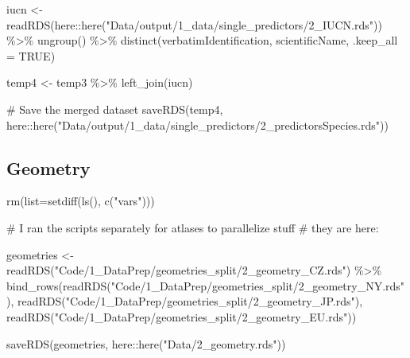 \documentclass[
  letterpaper,
  DIV=11,
  numbers=noendperiod]{scrreprt}
\newenvironment{Shaded}{\begin{snugshade}}{\end{snugshade}}
\newcommand{\AttributeTok}[1]{\textcolor[rgb]{0.40,0.45,0.13}{#1}}
\newcommand{\CommentTok}[1]{\textcolor[rgb]{0.37,0.37,0.37}{#1}}
\newcommand{\ConstantTok}[1]{\textcolor[rgb]{0.56,0.35,0.01}{#1}}
\newcommand{\FunctionTok}[1]{\textcolor[rgb]{0.28,0.35,0.67}{#1}}
\newcommand{\NormalTok}[1]{\textcolor[rgb]{0.00,0.23,0.31}{#1}}
\newcommand{\OtherTok}[1]{\textcolor[rgb]{0.00,0.23,0.31}{#1}}
\newcommand{\SpecialCharTok}[1]{\textcolor[rgb]{0.37,0.37,0.37}{#1}}
\newcommand{\StringTok}[1]{\textcolor[rgb]{0.13,0.47,0.30}{#1}}
\begin{document}
\begin{Shaded}
\begin{Highlighting}[]
\NormalTok{iucn }\OtherTok{\textless{}{-}} \FunctionTok{readRDS}\NormalTok{(here}\SpecialCharTok{::}\FunctionTok{here}\NormalTok{(}\StringTok{"Data/output/1\_data/single\_predictors/2\_IUCN.rds"}\NormalTok{)) }\SpecialCharTok{\%\textgreater{}\%}
  \FunctionTok{ungroup}\NormalTok{() }\SpecialCharTok{\%\textgreater{}\%}
  \FunctionTok{distinct}\NormalTok{(verbatimIdentification, scientificName, }\AttributeTok{.keep\_all =} \ConstantTok{TRUE}\NormalTok{) }

\NormalTok{temp4 }\OtherTok{\textless{}{-}}\NormalTok{ temp3 }\SpecialCharTok{\%\textgreater{}\%} \FunctionTok{left\_join}\NormalTok{(iucn) }


\CommentTok{\# Save the merged dataset}
\FunctionTok{saveRDS}\NormalTok{(temp4, here}\SpecialCharTok{::}\FunctionTok{here}\NormalTok{(}\StringTok{"Data/output/1\_data/single\_predictors/2\_predictorsSpecies.rds"}\NormalTok{))}
\end{Highlighting}
\end{Shaded}

\hypertarget{geometry}{%
\subsection{Geometry}\label{geometry}}

\begin{Shaded}
\begin{Highlighting}[]
\FunctionTok{rm}\NormalTok{(}\AttributeTok{list=}\FunctionTok{setdiff}\NormalTok{(}\FunctionTok{ls}\NormalTok{(), }\FunctionTok{c}\NormalTok{(}\StringTok{"vars"}\NormalTok{)))}

\CommentTok{\# I ran the scripts separately for atlases to parallelize stuff}
\CommentTok{\# they are here:}

\NormalTok{geometries }\OtherTok{\textless{}{-}} \FunctionTok{readRDS}\NormalTok{(}\StringTok{"Code/1\_DataPrep/geometries\_split/2\_geometry\_CZ.rds"}\NormalTok{) }\SpecialCharTok{\%\textgreater{}\%}
  \FunctionTok{bind\_rows}\NormalTok{(}\FunctionTok{readRDS}\NormalTok{(}\StringTok{"Code/1\_DataPrep/geometries\_split/2\_geometry\_NY.rds"}\NormalTok{), }
        \FunctionTok{readRDS}\NormalTok{(}\StringTok{"Code/1\_DataPrep/geometries\_split/2\_geometry\_JP.rds"}\NormalTok{),}
        \FunctionTok{readRDS}\NormalTok{(}\StringTok{"Code/1\_DataPrep/geometries\_split/2\_geometry\_EU.rds"}\NormalTok{))}

\FunctionTok{saveRDS}\NormalTok{(geometries, here}\SpecialCharTok{::}\FunctionTok{here}\NormalTok{(}\StringTok{"Data/2\_geometry.rds"}\NormalTok{))}
\end{Highlighting}
\end{Shaded}
\end{document}
